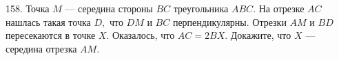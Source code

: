 158. Точка $M$ --- середина стороны $BC$ треугольника $ABC.$ На отрезке $AC$ нашлась такая точка $D,$ что $DM$ и $BC$ перпендикулярны. Отрезки $AM$ и $BD$ пересекаются в точке $X.$ Оказалось, что
$AC = 2BX.$ Докажите, что $X$ --- середина отрезка $AM.$\\
